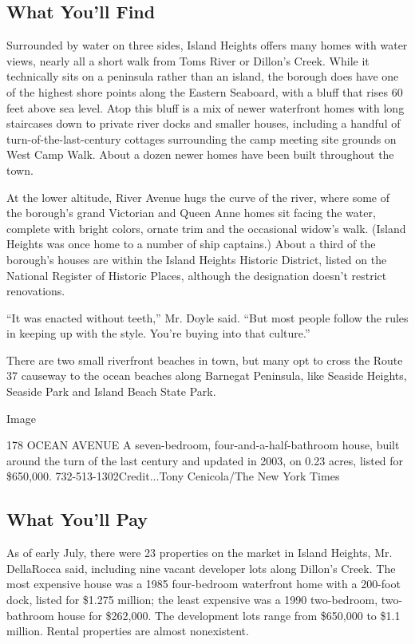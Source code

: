 \hypertarget{what-youll-find}{%
\subsection{What You'll Find}\label{what-youll-find}}

Surrounded by water on three sides, Island Heights offers many homes
with water views, nearly all a short walk from Toms River or Dillon's
Creek. While it technically sits on a peninsula rather than an island,
the borough does have one of the highest shore points along the Eastern
Seaboard, with a bluff that rises 60 feet above sea level. Atop this
bluff is a mix of newer waterfront homes with long staircases down to
private river docks and smaller houses, including a handful of
turn-of-the-last-century cottages surrounding the camp meeting site
grounds on West Camp Walk. About a dozen newer homes have been built
throughout the town.

At the lower altitude, River Avenue hugs the curve of the river, where
some of the borough's grand Victorian and Queen Anne homes sit facing
the water, complete with bright colors, ornate trim and the occasional
widow's walk. (Island Heights was once home to a number of ship
captains.) About a third of the borough's houses are within the Island
Heights Historic District, listed on the National Register of Historic
Places, although the designation doesn't restrict renovations.

``It was enacted without teeth,'' Mr. Doyle said. ``But most people
follow the rules in keeping up with the style. You're buying into that
culture.''

There are two small riverfront beaches in town, but many opt to cross
the Route 37 causeway to the ocean beaches along Barnegat Peninsula,
like Seaside Heights, Seaside Park and Island Beach State Park.

Image

178 OCEAN AVENUE \textbar{} A seven-bedroom, four-and-a-half-bathroom
house, built around the turn of the last century and updated in 2003, on
0.23 acres, listed for \$650,000. 732-513-1302Credit...Tony Cenicola/The
New York Times

\hypertarget{what-youll-pay}{%
\subsection{What You'll Pay}\label{what-youll-pay}}

As of early July, there were 23 properties on the market in Island
Heights, Mr. DellaRocca said, including nine vacant developer lots along
Dillon's Creek. The most expensive house was a 1985 four-bedroom
waterfront home with a 200-foot dock, listed for \$1.275 million; the
least expensive was a 1990 two-bedroom, two-bathroom house for
\$262,000. The development lots range from \$650,000 to \$1.1 million.
Rental properties are almost nonexistent.

